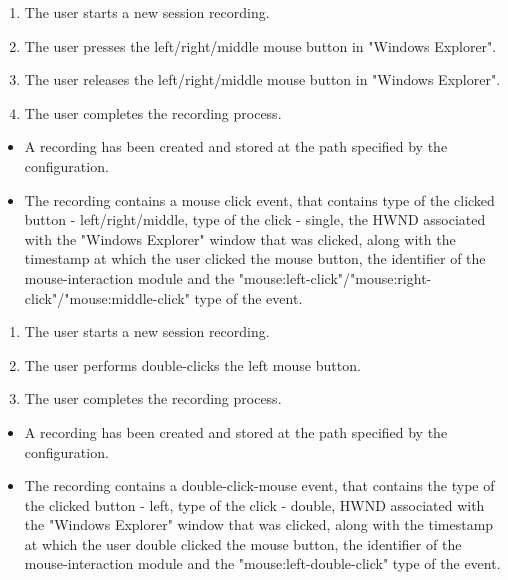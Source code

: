 \begin{tests}
	{\begin{enumerate}
		\item The \gls{user} starts a new \gls{session} recording.
		\item The \gls{user} presses the left/right/middle mouse button in "Windows Explorer".
		\item The \gls{user} releases the left/right/middle mouse button in "Windows Explorer".
		\item The \gls{user} completes the recording process.
	\end{enumerate}}
	{\begin{itemize}
		\item A recording has been created and stored at the path specified by the configuration.
		\item The recording contains a mouse click \gls{event},  that contains type of the clicked button - left/right/middle, type of the click - single, the HWND associated with the "Windows Explorer" window that was clicked, along with the timestamp at which the \gls{user} clicked the mouse button, the identifier of the mouse-interaction module and the "mouse:left-click"/"mouse:right-click"/"mouse:middle-click" type of the event.
	\end{itemize}}
	
	{\begin{enumerate}
		\item The \gls{user} starts a new \gls{session} recording.
		\item The \gls{user} performs double-clicks the left mouse button.
		\item The \gls{user} completes the recording process.
	\end{enumerate}}
	{\begin{itemize}
		\item A recording has been created and stored at the path specified by the configuration.
		\item The recording contains a double-click-mouse \gls{event},  that contains the type of the clicked button - left, type of the click - double, HWND associated with the "Windows Explorer" window that was clicked, along with the timestamp at which the \gls{user} double clicked the mouse button, the identifier of the mouse-interaction module and the "mouse:left-double-click" type of the event.
	\end{itemize}}


\end{tests}
